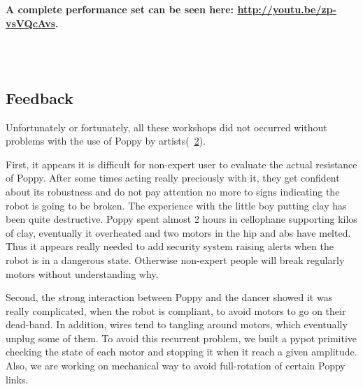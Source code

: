 \textbf{A complete performance set can be seen here: \url{http://youtu.be/zp-vsVQcAvs}.}

\begin{figure}[p]
\centering
    \hfil
    \\
    \hfil
    \\
    \caption{}
    \label{fig:poppy_dance_performance}
\end{figure}


\subsection{Feedback} %

Unfortunately or fortunately, all these workshops did not occurred without problems with the use of Poppy by artists(\figurename~\ref{fig:broken_poppy_residency}).

First, it appears it is difficult for non-expert user to evaluate the actual resistance of Poppy. After some times acting really preciously with it, they get confident about its robustness and do not pay attention no more to signs indicating the robot is going to be broken. The experience with the little boy putting clay has been quite destructive. Poppy spent almost 2 hours in cellophane supporting kilos of clay, eventually it overheated and two motors in the hip and abs have melted.
Thus it appears really needed to add security system raising alerts when the robot is in a dangerous state.  Otherwise non-expert people will break regularly motors without understanding why.

\begin{figure}[]
\centering
    \hfil
    \caption{}
    \label{fig:broken_poppy_residency}
\end{figure}

Second, the strong interaction between Poppy and the dancer showed it was really complicated, when the robot is compliant, to avoid motors to go on their dead-band. In addition, wires tend to tangling around motors, which eventually unplug some of them. To avoid this recurrent problem, we built a pypot primitive checking the state of each motor and stopping it when it reach a given amplitude. Also, we are working on mechanical way to avoid full-rotation of certain Poppy links.

